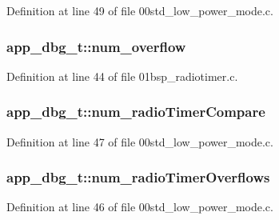Definition at line 49 of file 00std\+\_\+low\+\_\+power\+\_\+mode.\+c.

\subsubsection[{\texorpdfstring{num\+\_\+overflow}{num_overflow}}]{ app\+\_\+dbg\+\_\+t\+::num\+\_\+overflow}\hypertarget{structapp__dbg__t_ac0c63b6583f140e0966f2ff7d421cbfb}{}\label{structapp__dbg__t_ac0c63b6583f140e0966f2ff7d421cbfb}


Definition at line 44 of file 01bsp\+\_\+radiotimer.\+c.

\subsubsection[{\texorpdfstring{num\+\_\+radio\+Timer\+Compare}{num_radioTimerCompare}}]{ app\+\_\+dbg\+\_\+t\+::num\+\_\+radio\+Timer\+Compare}\hypertarget{structapp__dbg__t_aef9a561afce385697dc10ecf1150c1d5}{}\label{structapp__dbg__t_aef9a561afce385697dc10ecf1150c1d5}


Definition at line 47 of file 00std\+\_\+low\+\_\+power\+\_\+mode.\+c.

\subsubsection[{\texorpdfstring{num\+\_\+radio\+Timer\+Overflows}{num_radioTimerOverflows}}]{ app\+\_\+dbg\+\_\+t\+::num\+\_\+radio\+Timer\+Overflows}\hypertarget{structapp__dbg__t_add6dbed22a807e4123bc0373e0f68046}{}\label{structapp__dbg__t_add6dbed22a807e4123bc0373e0f68046}


Definition at line 46 of file 00std\+\_\+low\+\_\+power\+\_\+mode.\+c.

